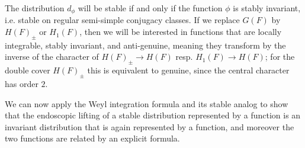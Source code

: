 \documentclass{article}
\theoremstyle{definition}
\numberwithin{equation}{section}
\renewcommand{\-}{\hyp{}}
\begin{document}
The distribution $d_\phi$ will be stable if and only if the function $\phi$ is stably invariant, i.e. stable on regular semi-simple conjugacy classes. If we replace $G(F)$ by $H(F)_\pm$ or $H_1(F)$, then we will be interested in functions that are locally integrable, stably invariant, and anti-genuine, meaning they transform by the inverse of the  character of $H(F)_\pm \to H(F)$ resp. $H_1(F) \to H(F)$; for the double cover $H(F)_\pm$ this is equivalent to genuine, since the central character has order $2$.

We can now apply the Weyl integration formula and its stable analog to show that the endoscopic lifting of a stable distribution represented by a function is an invariant distribution that is again represented by a function, and moreover the two functions are related by an explicit formula.
\end{document}
